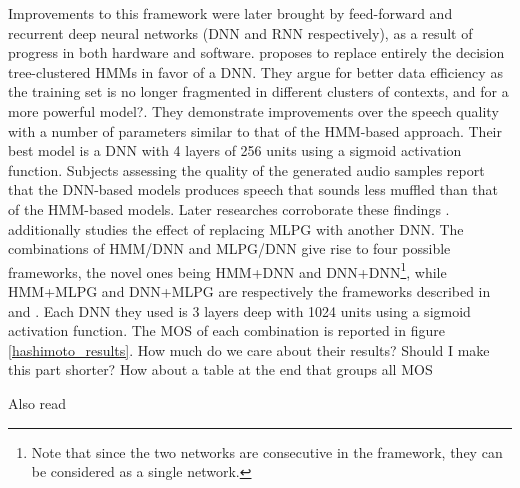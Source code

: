 \documentclass[a4paper, oneside]{article}
\begin{document}
Improvements to this framework were later brought by feed-forward and recurrent deep neural networks (DNN and RNN respectively), as a result of progress in both hardware and software. \cite{SPSSDNN} proposes to replace entirely the decision tree-clustered HMMs in favor of a DNN. They argue for better data efficiency as the training set is no longer fragmented in different clusters of contexts\color{red}, and for a more powerful model?\color{black}. They demonstrate improvements over the speech quality with a number of parameters similar to that of the HMM-based approach. Their best model is a DNN with 4 layers of 256 units using a sigmoid activation function. Subjects assessing the quality of the generated audio samples report that the DNN-based models produces speech that sounds less muffled than that of the HMM-based models. Later researches corroborate these findings \cite{OnTheTrainingAspects}. \cite{Hashimoto-2015} additionally studies the effect of replacing MLPG with another DNN. The combinations of HMM/DNN and MLPG/DNN give rise to four possible frameworks, the novel ones being HMM+DNN and DNN+DNN\footnote{Note that since the two networks are consecutive in the framework, they can be considered as a single network.}, while HMM+MLPG and DNN+MLPG are respectively the frameworks described in \cite{Tokuda-2013} and \cite{SPSSDNN}. Each DNN they used is 3 layers deep with 1024 units using a sigmoid activation function. The MOS of each combination is reported in figure \ref{hashimoto_results}. \color{red} How much do we care about their results? Should I make this part shorter? How about a table at the end that groups all MOS \color{black}



\color{red}
Also read \cite{Yin2014ModelingDP}
\color{black}
\end{document}
